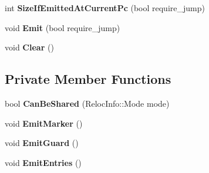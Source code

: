 \begin{DoxyCompactItemize}
\item 
int {\bfseries Size\+If\+Emitted\+At\+Current\+Pc} (bool require\+\_\+jump)\hypertarget{classv8_1_1internal_1_1_const_pool_a7564d0079adb1c574dc1f505cf56e97a}{}\label{classv8_1_1internal_1_1_const_pool_a7564d0079adb1c574dc1f505cf56e97a}

\item 
void {\bfseries Emit} (bool require\+\_\+jump)\hypertarget{classv8_1_1internal_1_1_const_pool_aa6ea87074c1835b249d592f1c696a219}{}\label{classv8_1_1internal_1_1_const_pool_aa6ea87074c1835b249d592f1c696a219}

\item 
void {\bfseries Clear} ()\hypertarget{classv8_1_1internal_1_1_const_pool_ad00c13ed8f086484fa21e453c39cc05c}{}\label{classv8_1_1internal_1_1_const_pool_ad00c13ed8f086484fa21e453c39cc05c}

\end{DoxyCompactItemize}
\subsection*{Private Member Functions}
\begin{DoxyCompactItemize}
\item 
bool {\bfseries Can\+Be\+Shared} (Reloc\+Info\+::\+Mode mode)\hypertarget{classv8_1_1internal_1_1_const_pool_aec8ba4937fbe64d0083f604b939692d9}{}\label{classv8_1_1internal_1_1_const_pool_aec8ba4937fbe64d0083f604b939692d9}

\item 
void {\bfseries Emit\+Marker} ()\hypertarget{classv8_1_1internal_1_1_const_pool_a566ba50ae7a88405061f8268e0dc56cc}{}\label{classv8_1_1internal_1_1_const_pool_a566ba50ae7a88405061f8268e0dc56cc}

\item 
void {\bfseries Emit\+Guard} ()\hypertarget{classv8_1_1internal_1_1_const_pool_afcfba5e7c31fa46ca7853cc5276ffa60}{}\label{classv8_1_1internal_1_1_const_pool_afcfba5e7c31fa46ca7853cc5276ffa60}

\item 
void {\bfseries Emit\+Entries} ()\hypertarget{classv8_1_1internal_1_1_const_pool_a58968805b24d8874c8c9ab929d2616b2}{}\label{classv8_1_1internal_1_1_const_pool_a58968805b24d8874c8c9ab929d2616b2}

\end{DoxyCompactItemize}

